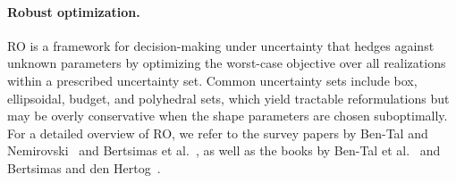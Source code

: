 \paragraph{Robust optimization.}
\Gls{RO} is a framework for decision-making under uncertainty that hedges against unknown parameters by optimizing the worst-case objective over all realizations within a prescribed uncertainty set.
Common uncertainty sets include box, ellipsoidal, budget, and polyhedral sets, which yield tractable reformulations but may be overly conservative when the shape parameters are chosen suboptimally. 
For a detailed overview of \gls{RO}, we refer to the survey papers by Ben-Tal and Nemirovski~\citep{robustconvexopt} and Bertsimas et al.~\citep{bertsimassurvey}, as well as the books by Ben-Tal et al.~\citep{ben-tal_robust_2009} and Bertsimas and den Hertog~\citep{robustadaptopt}.


